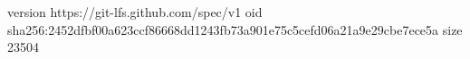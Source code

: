 version https://git-lfs.github.com/spec/v1
oid sha256:2452dfbf00a623ccf86668dd1243fb73a901e75c5cefd06a21a9e29cbe7ece5a
size 23504
